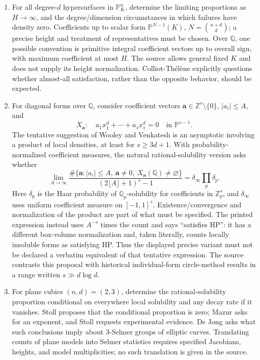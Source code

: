 \documentclass[11pt]{article}
\newcommand{\Z}{\mathbb{Z}}
\newcommand{\Q}{\mathbb{Q}}
\newcommand{\PP}{\mathbb{P}}
\begin{document}
\begin{enumerate}
\item For all degree-\(d\) hypersurfaces in \(\PP^n_K\), determine the limiting proportions as \(H\to\infty\), and the degree/dimension circumstances in which failures have density zero. Coefficients up to scalar form \(\PP^{N-1}(K)\), \(N=\binom{n+d}{d}\); a precise height and treatment of representatives must be chosen. Over \(\Q\), one possible convention is primitive integral coefficient vectors up to overall sign, with maximum coefficient at most \(H\). The source allows general fixed \(K\) and does not supply its height normalization. Colliot-Th\'el\`ene explicitly questions whether almost-all satisfaction, rather than the opposite behavior, should be expected.
\item For diagonal forms over \(\Q\), consider coefficient vectors \(\mathbf a\in\Z^s\setminus\{0\}\), \(|a_i|\leq A\), and
\[
X_{\mathbf a}:\quad a_1x_1^d+\cdots+a_sx_s^d=0\quad\text{in }\PP^{s-1}.
\]
The tentative suggestion of Wooley and Venkatesh is an asymptotic involving a product of local densities, at least for \(s\geq3d+1\). With probability-normalized coefficient measures, the natural rational-solubility version asks whether
\[
\lim_{A\to\infty}\frac{\#\{\mathbf a:|a_i|\leq A,\ \mathbf a\ne0,\ X_{\mathbf a}(\Q)\ne\varnothing\}}
{(2\lfloor A\rfloor+1)^s-1}
=\delta_\infty\prod_p\delta_p.
\]
Here \(\delta_p\) is the Haar probability of \(\Q_p\)-solubility for coefficients in \(\Z_p^s\), and \(\delta_\infty\) uses uniform coefficient measure on \([-1,1]^s\). Existence/convergence and normalization of the product are part of what must be specified. The printed expression instead uses \(A^{-s}\) times the count and says ``satisfies HP'': it has a different box-volume normalization and, taken literally, counts locally insoluble forms as satisfying HP. Thus the displayed precise variant must not be declared a verbatim equivalent of that tentative expression. The source contrasts this proposal with historical individual-form circle-method results in a range written \(s\gg d\log d\).
\item For plane cubics \((n,d)=(2,3)\), determine the rational-solubility proportion conditional on everywhere local solubility and any decay rate if it vanishes. Stoll proposes that the conditional proportion is zero; Mazur asks for an exponent, and Stoll requests experimental evidence. De Jong asks what such conclusions imply about \(3\)-Selmer groups of elliptic curves. Translating counts of plane models into Selmer statistics requires specified Jacobians, heights, and model multiplicities; no such translation is given in the source.
\end{enumerate}
\end{document}
